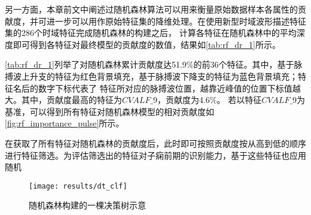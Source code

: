 另一方面，本章前文中阐述过随机森林算法可以用来衡量原始数据样本各属性的贡献度，并可进一步可以用作原始特征集的降维处理。在使用新型时域波形描述特征集的286个时域特征完成随机森林的构建之后，
计算各特征在随机森林中的平均深度即可得到各特征对最终模型的贡献度的数值，结果如\autoref{tab:rf_dr_1}所示。

\autoref{tab:rf_dr_1}列举了对随机森林累计贡献度达51.9\%的前36个特征。其中，基于脉搏波上升支的特征为红色背景填充，基于脉搏波下降支的特征为蓝色背景填充；特征名后的数字下标代表了
特征所对应的脉搏波位置，越靠近峰值的位置下标值越大。其中，贡献度最高的特征为$CVALF\_9$，贡献度为4.6\%。
若以特征$CVALF\_9$为基准，可以得到所有特征对随机森林模型的相对贡献度如\autoref{fig:rf_importance_pulse}所示。

在获取了所有特征对随机森林的贡献度后，此时即可按照贡献度按从高到低的顺序进行特征筛选。为评估筛选出的特征对子痫前期的识别能力，基于这些特征也应用随机

\begin{landscape}
      \begin{figure}[htbp]
            \centering
            \texttt{[image: results/dt\_clf]}
            \caption{\label{fig:dt_clf}随机森林构建的一棵决策树示意}
      \end{figure}
\end{landscape}


